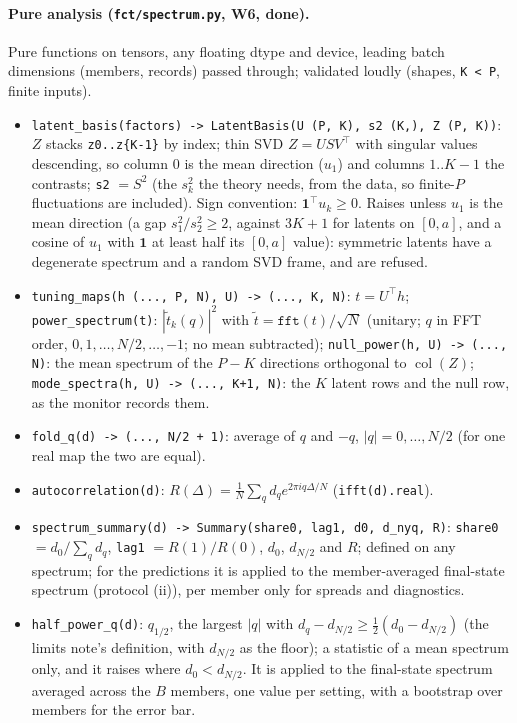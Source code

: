 \documentclass[11pt,a4paper]{article}
\newcommand{\col}{\operatorname{col}}
\newcommand{\code}[1]{\texttt{#1}}
\begin{document}
\paragraph{Pure analysis (\code{fct/spectrum.py}, W6, done).} Pure functions on tensors, any floating dtype and device, leading batch dimensions (members, records) passed through; validated loudly (shapes, \code{K < P}, finite inputs).
\begin{itemize}[nosep]
  \item \code{latent\_basis(factors) -> LatentBasis(U (P, K), s2 (K,), Z (P, K))}: $Z$ stacks \code{z0..z\{K-1\}} by index; thin SVD $Z = USV^\top$ with singular values descending, so column 0 is the mean direction ($u_1$) and columns $1..K-1$ the contrasts; \code{s2} $= S^2$ (the $s_k^2$ the theory needs, from the data, so finite-$P$ fluctuations are included). Sign convention: $\mathbf 1^\top u_k\ge0$. Raises unless $u_1$ is the mean direction (a gap $s_1^2/s_2^2\ge2$, against $3K + 1$ for latents on $[0, a]$, and a cosine of $u_1$ with $\mathbf 1$ at least half its $[0, a]$ value): symmetric latents have a degenerate spectrum and a random SVD frame, and are refused.
  \item \code{tuning\_maps(h (..., P, N), U) -> (..., K, N)}: $t = U^\top h$; \code{power\_spectrum(t)}: $|\tilde t_k(q)|^2$ with $\tilde t = \code{fft}(t)/\sqrt N$ (unitary; $q$ in FFT order, $0,1,\dots,N/2,\dots,-1$; no mean subtracted); \code{null\_power(h, U) -> (..., N)}: the mean spectrum of the $P - K$ directions orthogonal to $\col(Z)$; \code{mode\_spectra(h, U) -> (..., K+1, N)}: the $K$ latent rows and the null row, as the monitor records them.
  \item \code{fold\_q(d) -> (..., N/2 + 1)}: average of $q$ and $-q$, $|q| = 0,\dots,N/2$ (for one real map the two are equal).
  \item \code{autocorrelation(d)}: $R(\Delta) = \frac1N\sum_qd_qe^{2\pi iq\Delta/N}$ (\code{ifft(d).real}).
  \item \code{spectrum\_summary(d) -> Summary(share0, lag1, d0, d\_nyq, R)}: \code{share0} $= d_0/\sum_qd_q$, \code{lag1} $= R(1)/R(0)$, $d_0$, $d_{N/2}$ and $R$; defined on any spectrum; for the predictions it is applied to the member-averaged final-state spectrum (protocol (ii)), per member only for spreads and diagnostics.
  \item \code{half\_power\_q(d)}: $q_{1/2}$, the largest $|q|$ with $d_q - d_{N/2}\ge\frac12(d_0 - d_{N/2})$ (the limits note's definition, with $d_{N/2}$ as the floor); a statistic of a mean spectrum only, and it raises where $d_0 < d_{N/2}$. It is applied to the final-state spectrum averaged across the $B$ members, one value per setting, with a bootstrap over members for the error bar.

\end{itemize}
\end{document}
